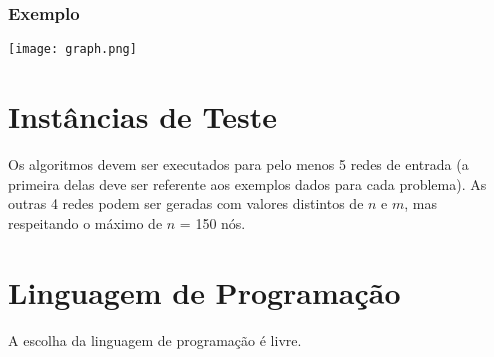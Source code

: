 \documentclass[a4paper,10pt]{article}
\begin{document}
\subsubsection{Exemplo}


\texttt{[image: graph.png]}

\section{ Instâncias de Teste}

Os algoritmos devem ser executados para pelo menos 5
redes de entrada (a primeira delas deve ser referente
aos exemplos dados para cada problema). As outras 4
redes podem ser geradas com valores distintos de $n$ e $m$,
mas respeitando o máximo de $n$ = 150 nós.


\section{Linguagem de Programação}

A escolha da linguagem de programação é livre.
\end{document}
